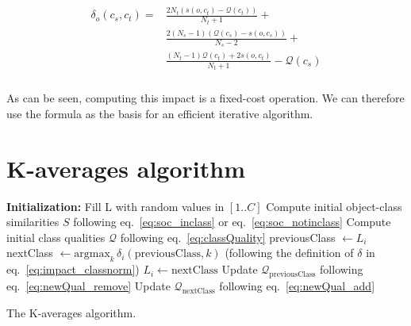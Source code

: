 \documentclass[natbib,smallextended]{svjour3}
\begin{document}
\begin{align}
\begin{split}
  \delta_o(c_s, c_t) = & \frac{2N_t \left(s\left(o, c_t\right)-\mathcal{Q}(c_t)\right)}{N_t+1} + \\
&  \frac{2(N_s-1)\left( \mathcal{Q}(c_s) - s\left(o, c_s\right)\right)}{N_s-2}  + \\
 &  \frac{(N_t-1) \mathcal{Q}(c_t)  + 2s\left(o, c_t\right)}{N_t+1} - \mathcal{Q}(c_s) \\
\end{split}
  \label{eq:impact_classnorm}
\end{align}

As can be seen, computing this impact is a fixed-cost operation. We can therefore use the formula as the basis for an efficient iterative algorithm.

\section{K-averages algorithm}
\label{sec:algo}

\begin{algorithm}[h!]
	\label{algo:kaverages}
	\SetAlgoLined
	\BlankLine
	\textbf{Initialization:}
		Fill L with random values in $[1..C]$\;
		Compute initial object-class similarities $S$ following eq.~\ref{eq:soc_inclass} or eq.~\ref{eq:soc_notinclass}\;
		Compute initial class qualities $\mathcal{Q}$ following eq.~\ref{eq:classQuality}\;
	\BlankLine
	 {
		 {
			previousClass $\leftarrow L_i$\;
			nextClass $\leftarrow \mathrm{argmax}_k\,\delta_i(\mathrm{previousClass}, k)$ \label{algline:kaverages_search}
			(following the definition of $\delta$ in eq.~\ref{eq:impact_classnorm})\; %
			 {
				$L_i \leftarrow \mathrm{nextClass}$\;
				Update $\mathcal{Q}_\mathrm{previousClass}$ following eq.~\ref{eq:newQual_remove}\;
				Update $\mathcal{Q}_\mathrm{nextClass}$ following eq.~\ref{eq:newQual_add}\;
			}
		}
	}
	\BlankLine
	\caption{The K-averages algorithm.}
\end{algorithm}
\end{document}
